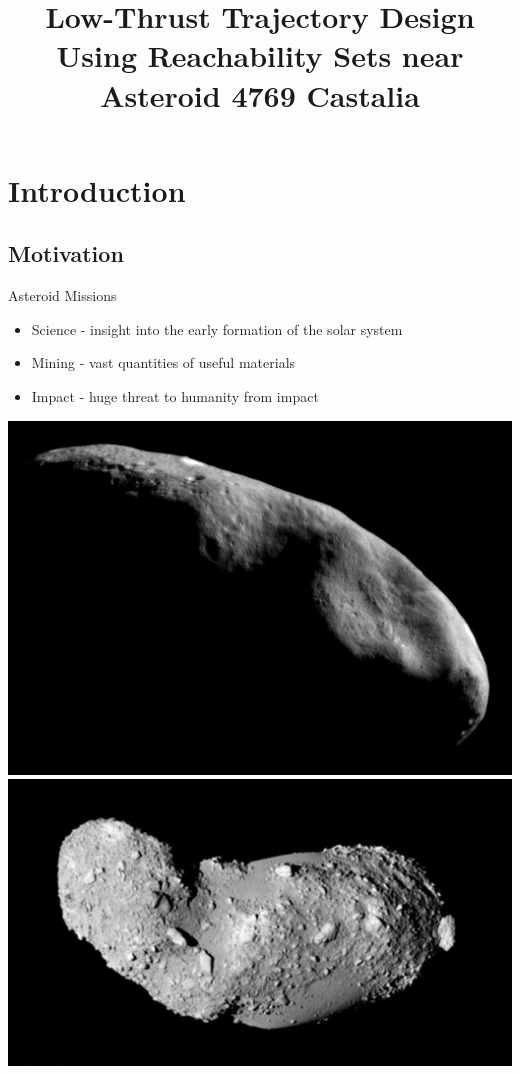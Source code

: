 \documentclass[11pt,professionalfonts]{beamer}
\title[Reachability Sets on \Poincare section]{\large\bf  Low-Thrust Trajectory Design Using Reachability Sets near Asteroid 4769 Castalia}
\author{\vspace*{-0.3cm}}
\institute{
  \footnotesize
  {\normalsize\bf{Shankar Kulumani and Taeyoung Lee}}\\
  \vspace*{0.2cm}
    \textbf{Flight Dynamics \& Control Lab}\\ \vspace*{0.5cm}
  \begin{figure} %
        \texttt{[image: gw\_txh\_2cs\_pos]}
    \end{figure}
}
\date{}
\begin{document}

\setcounter{framenumber}{-1}
\begin{frame} %
  \titlepage
\end{frame}   %

\section*{Introduction}
\subsection*{Motivation}  

\begin{frame}{Asteroid Missions}
\begin{itemize}
    \item Science - insight into the early formation of the solar system
    \item Mining - vast quantities of useful materials
    \item Impact - huge threat to humanity from impact
\end{itemize}    

\begin{center}
    \includegraphics[height=0.35\textheight]{figures/near_mos_20001203_full.jpg}
    \hfill
    \includegraphics[height=0.35\textheight]{figures/Itokawa8_hayabusa_1210.jpg}
\end{center}
\end{frame}
\end{document}
